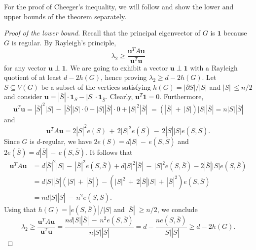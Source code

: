 For the proof of Cheeger's inequality, we will follow \cite{expandergraphs} and show the lower and upper bounds of the theorem separately.

\begin{proof}[Proof of the lower bound]
    Recall that the principal eigenvector of $G$ is $\bm{1}$ because $G$ is regular.
    By Rayleigh's principle, 
    \begin{equation*}
        \lambda_2 \ge \frac{\bm{u}^T A \bm{u}}{\bm{u}^T \bm{u}}
    \end{equation*}
    for any vector $\bm{u} \perp \bm{1}$. 
    We are going to exhibit a vector $\bm{u} \perp \bm{1}$ with a Rayleigh quotient of at least $d - 2 h(G)$, hence proving $\lambda_2 \ge d - 2 h(G)$.
    Let $S \subseteq V(G)$ be a subset of the vertices satisfying $h(G) = |\partial S|/|S|$ and $|S|\, \le n/2$ and consider $\bm{u} = |\overline{S}| \cdot \bm{1}_S - |S| \cdot \bm{1}_{\overline{S}}$.
    Clearly, $\bm{u}^T \bm{1} = 0$. Furthermore,
    \begin{equation*}
        \bm{u}^T \bm{u} = 
            |\overline{S}|^2 |S|\, -\, |\overline{S}| |S| \cdot 0 - |S| |\overline{S}| \cdot 0 + |S|^2 |\overline{S}|\;
        = (|\overline{S}| \,+\, |S|) |S| |\overline{S}|  = n |S| |\overline{S}| 
    \end{equation*}
    and
    \begin{equation*}
        \bm{u}^T A \bm{u} = 2|\overline{S}|^2 e(S)\,+\, 2|S|^2 e(\overline{S})\, -\, 2 |\overline{S}| |S| e(S, \overline{S}).
    \end{equation*}
    Since $G$ is $d$-regular, we have $2 e(S) = d|S|\, -\, e(S, \overline{S})$ and $2 e(\overline{S}) = d |\overline{S}|\, -\, e(S, \overline{S})$. It follows that 
    \begin{align*}
        \bm{u}^T A \bm{u} &= d|\overline{S}|^2 |S| \,-\, |\overline{S}|^2 e(S, \overline{S}) + d|S|^2 |\overline{S}| \,-\, |S|^2 e(S, \overline{S}) - 2|\overline{S}| |S| e(S, \overline{S}) \\
        &= d|S||\overline{S}| (|S| \,+\, |\overline{S}|) - (|S|^2 \,+\, 2 |\overline{S}| |S| \,+\, |\overline{S}|^2) e(S, \overline{S}) \\
        &= nd |S| |\overline{S}|\,-\, n^2 e(S, \overline{S}).
    \end{align*}
    Using that $h(G) = |e(S, \overline{S})|/|S|$ and $|\overline S|\; \ge n/2$, we conclude
    \begin{equation*}
        \lambda_2 \ge \frac{\bm{u}^T A \bm{u}}{\bm{u}^T \bm{u}} = \frac{nd |S| |\overline{S}| \,-\, n^2 e(S, \overline{S})}{n |S| |\overline S|} = d - \frac{n e(S, \overline S)}{|S| |\overline S|} \ge d - 2h(G).
    \end{equation*}
\end{proof}


